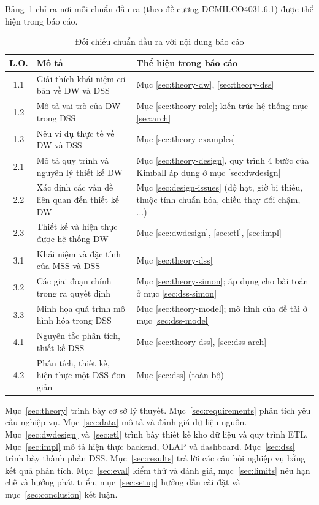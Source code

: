 Bảng~\ref{tab:lo} chỉ ra nơi mỗi chuẩn đầu ra (theo đề cương DCMH.CO4031.6.1) được thể hiện trong báo cáo.

\begin{table}[H]
\centering
\caption{Đối chiếu chuẩn đầu ra với nội dung báo cáo}
\label{tab:lo}
\begin{tabularx}{\textwidth}{|c|p{5.6cm}|X|}
\hline
\textbf{L.O.} & \textbf{Mô tả} & \textbf{Thể hiện trong báo cáo} \\ \hline
1.1 & Giải thích khái niệm cơ bản về DW và DSS & Mục \ref{sec:theory-dw}, \ref{sec:theory-dss} \\ \hline
1.2 & Mô tả vai trò của DW trong DSS & Mục \ref{sec:theory-role}; kiến trúc hệ thống mục \ref{sec:arch} \\ \hline
1.3 & Nêu ví dụ thực tế về DW và DSS & Mục \ref{sec:theory-examples} \\ \hline
2.1 & Mô tả quy trình và nguyên lý thiết kế DW & Mục \ref{sec:theory-design}, quy trình 4 bước của Kimball áp dụng ở mục \ref{sec:dwdesign} \\ \hline
2.2 & Xác định các vấn đề liên quan đến thiết kế DW & Mục \ref{sec:design-issues} (độ hạt, giờ bị thiếu, thuộc tính chuẩn hóa, chiều thay đổi chậm, ...) \\ \hline
2.3 & Thiết kế và hiện thực được hệ thống DW & Mục \ref{sec:dwdesign}, \ref{sec:etl}, \ref{sec:impl} \\ \hline
3.1 & Khái niệm và đặc tính của MSS và DSS & Mục \ref{sec:theory-dss} \\ \hline
3.2 & Các giai đoạn chính trong ra quyết định & Mục \ref{sec:theory-simon}; áp dụng cho bài toán ở mục \ref{sec:dss-simon} \\ \hline
3.3 & Minh họa quá trình mô hình hóa trong DSS & Mục \ref{sec:theory-model}; mô hình của đề tài ở mục \ref{sec:dss-model} \\ \hline
4.1 & Nguyên tắc phân tích, thiết kế DSS & Mục \ref{sec:theory-dss}, \ref{sec:dss-arch} \\ \hline
4.2 & Phân tích, thiết kế, hiện thực một DSS đơn giản & Mục \ref{sec:dss} (toàn bộ) \\ \hline
\end{tabularx}
\end{table}

Mục~\ref{sec:theory} trình bày cơ sở lý thuyết. Mục~\ref{sec:requirements} phân tích yêu cầu nghiệp vụ. Mục~\ref{sec:data} mô tả và đánh giá dữ liệu nguồn. Mục~\ref{sec:dwdesign} và~\ref{sec:etl} trình bày thiết kế kho dữ liệu và quy trình ETL. Mục~\ref{sec:impl} mô tả hiện thực backend, OLAP và dashboard. Mục~\ref{sec:dss} trình bày thành phần DSS. Mục~\ref{sec:results} trả lời các câu hỏi nghiệp vụ bằng kết quả phân tích. Mục~\ref{sec:eval} kiểm thử và đánh giá, mục~\ref{sec:limits} nêu hạn chế và hướng phát triển, mục~\ref{sec:setup} hướng dẫn cài đặt và mục~\ref{sec:conclusion} kết luận.
